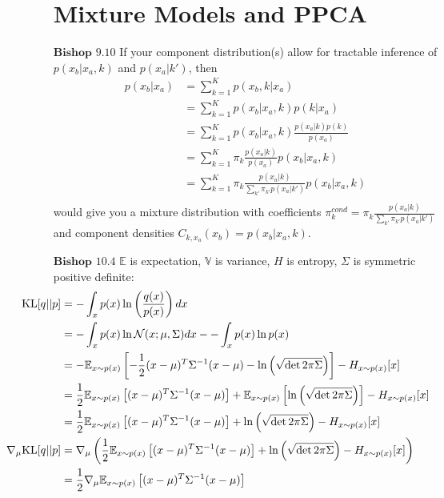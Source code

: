 \documentclass[11pt]{article} %
\begin{document}
\begin{enumerate}
\section{Mixture Models and PPCA}
\item[$\textbf{Bishop }9.10$] If your component distribution(s) allow for tractable inference of  $p(x_b|x_a,k)$ and $p(x_a | k')$, then\begin{align*}
	p(x_b|x_a) 
	&= \sum_{k=1}^Kp(x_b,k|x_a)\\
	&= \sum_{k=1}^Kp(x_b|x_a,k)p(k|x_a)\\
	&= \sum_{k=1}^Kp(x_b|x_a,k)\frac{p(x_a|k)p(k)}{p(x_a)}\\
	&= \sum_{k=1}^K\pi_k \frac{p(x_a|k)}{p(x_a)} p(x_b|x_a,k)\\
	&= \sum_{k=1}^K\pi_k \frac{p(x_a|k)}{\sum_{k'}\pi_{k'} p(x_a | k')} p(x_b|x_a,k)\\
\end{align*}
would give you a mixture distribution with coefficients 
$\pi^{cond}_{k}=\pi_k\frac{p(x_a|k)}{\sum_{k'}\pi_{k'} p(x_a | k')}$
and component densities $C_{k,x_a}(x_b)=p(x_b|x_a,k)$.
\newpage
\item[$\textbf{Bishop }10.4$] $\mathbb E$ is expectation, $\mathbb V$ is variance, $H$ is entropy, $\Sigma$ is symmetric positive definite:\begin{align*}
 	\hspace{-2cm}\textrm{KL}[q||p]
 	&= -\int_x p(x) \ln \left(\frac{q(x)}{p(x)} \right)dx \\
 	&= -\int_x p(x) \ln \mathcal{N}(x;\mu, \Sigma)dx - -\int_x p(x)\ln p(x) \\
 	&= -\mathbb{E}_{x\sim p(x)}\left[-\frac{1}{2}(x-\mu)^T\Sigma^{-1}(x-\mu)  - \ln\left(\sqrt{\det 2\pi\Sigma}\right)\right] - H_{x\sim p(x)} [x] \\
 	&= \frac{1}{2}\mathbb{E}_{x\sim p(x)}\left[(x-\mu)^T\Sigma^{-1}(x-\mu)\right]+ \mathbb{E}_{x\sim p(x)}\left[\ln\left(\sqrt{\det 2\pi\Sigma}\right)\right] - H_{x\sim p(x)} [x] \\
 	&= \frac{1}{2}\mathbb{E}_{x\sim p(x)}\left[(x-\mu)^T\Sigma^{-1}(x-\mu)\right]+ \ln\left(\sqrt{\det 2\pi\Sigma}\right) - H_{x\sim p(x)} [x] \\
 	\hspace{-2cm}\nabla_\mu\textrm{KL}[q||p]
 	&= \nabla_\mu \left(\frac{1}{2}\mathbb{E}_{x\sim p(x)}\left[(x-\mu)^T\Sigma^{-1}(x-\mu)\right]+ \ln\left(\sqrt{\det 2\pi\Sigma}\right) - H_{x\sim p(x)} [x]\right) \\
 	&=  \frac{1}{2}\nabla_\mu\mathbb{E}_{x\sim p(x)}\left[(x-\mu)^T\Sigma^{-1}(x-\mu)\right] \\

\end{align*}
\end{enumerate}
\end{document}
